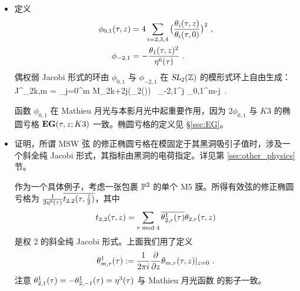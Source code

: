 \begin{itemize}
\item 
定义
\begin{gather}
\begin{split}
\label{phi01}
\phi_{0,1}(\tau,z)&=4 \sum_{i=2,3,4}\big(\frac{\theta_i(\tau,z)}{\theta_i(\tau,0)}\big)^2~,  \\
\phi_{-2,1} &= -{\theta_1(\tau,z)^2\over \eta^6(\tau)}~. 
\end{split}
\end{gather}
偶权弱 Jacobi 形式的环由 $ \phi_{0,1}$ 与 $ \phi_{-2,1}$ 在 $\operatorname{\textsl{SL}}_2(\mathbb{Z})$ 的模形式环上自由生成：
\be
J^{\wk}_{2k,m} = \sum_{j=0}^{m} M_{2k+2j}(\SL_2(\ZZ)) \,   \phi_{-2,1}^j \phi_{0,1}^{m-j}~. 
\ee


函数 $  \phi_{0,1}$ 在 Mathieu 月光与本影月光中起重要作用，因为 $ 2 \phi_{0,1}$ 与 $K3$ 的椭圆亏格 ${\bf EG}(\tau,z;K3)$ 一致。椭圆亏格的定义见 \S\ref{sec:EG}。

\item{\cite{Cheng:2017dlj} 证明，所谓 MSW 弦 \cite{Maldacena:1997de} 的修正椭圆亏格在模固定于其黑洞吸引子值时，涉及一个斜全纯 Jacobi 形式，其指标由黑洞的电荷指定。详见第 \ref{sec:other_physics} 节。}


作为一个具体例子，考虑一张包裹 $\mathbb{P}^2$ 的单个 M5 膜。所得有效弦的修正椭圆亏格为 ${1\over 2 \eta^6(\tau)}\overline{t_{2,2}(\tau, {\bar z\over 2})}$，其中 $$t_{2,2}(\tau,z) = \sum_{r{\rm \;mod\;}{4}} \overline{\theta^1_{2,r}(\tau)} \theta_{2,r}(\tau,z) $$ 是权 2 的斜全纯 Jacobi 形式。上面我们用了定义
\begin{equation}
\theta_{m,r}^1(\tau) := {1\over 2\pi i} {\partial\over\partial z}\theta_{m,r}(\tau,z)\lvert_{z=0}~.
\end{equation}
注意 $\theta^1_{2,1}(\tau) = -\theta^1_{2,-1}(\tau) = \eta^3(\tau)$ 与 Mathieu 月光函数  的影子一致。



\end{itemize}

